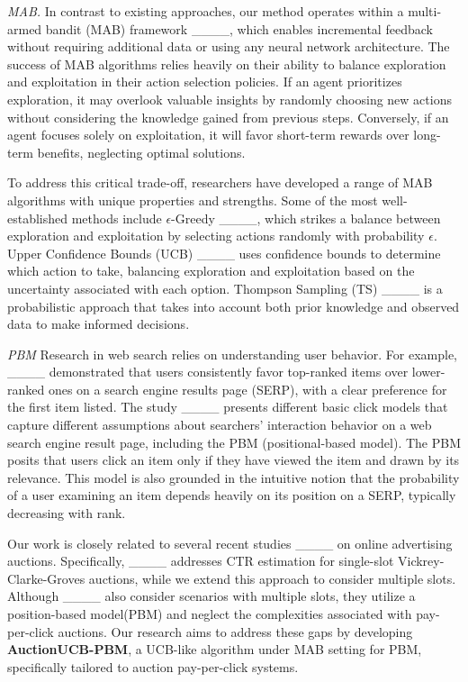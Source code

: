 \textit{MAB.} In contrast to existing approaches, our method operates within a multi-armed bandit (MAB) framework ____, which enables incremental feedback without requiring additional data or using any neural network architecture. The success of MAB algorithms relies heavily on their ability to balance exploration and exploitation in their action selection policies. If an agent prioritizes exploration, it may overlook valuable insights by randomly choosing new actions without considering the knowledge gained from previous steps. Conversely, if an agent focuses solely on exploitation, it will favor short-term rewards over long-term benefits, neglecting optimal solutions.

To address this critical trade-off, researchers have developed a range of MAB algorithms with unique properties and strengths. Some of the most well-established methods include $\epsilon$-Greedy ____, which strikes a balance between exploration and exploitation by selecting actions randomly with probability $\epsilon$. Upper Confidence Bounds (UCB) ____ uses confidence bounds to determine which action to take, balancing exploration and exploitation based on the uncertainty associated with each option. Thompson Sampling (TS) ____ is a probabilistic approach that takes into account both prior knowledge and observed data to make informed decisions.

\textit{PBM} Research in web search relies on understanding user behavior. For example, ____ demonstrated that users consistently favor top-ranked items over lower-ranked ones on a search engine results page (SERP), with a clear preference for the first item listed. The study ____ presents different basic click models that capture different assumptions about searchers' interaction behavior on a web search engine result page, including the PBM (positional-based model). The PBM posits that users click an item only if they have viewed the item and drawn by its relevance. This model is also grounded in the intuitive notion that the probability of a user examining an item depends heavily on its position on a SERP, typically decreasing with rank.

Our work is closely related to several recent studies ____ on online advertising auctions. Specifically,  ____ addresses CTR estimation for single-slot Vickrey-Clarke-Groves auctions, while we extend this approach to consider multiple slots. Although ____ also consider scenarios with multiple slots, they utilize a position-based model(PBM) and neglect the complexities associated with pay-per-click auctions. Our research aims to address these gaps by developing \textbf{AuctionUCB-PBM}, a UCB-like algorithm under MAB setting for PBM, specifically tailored to auction pay-per-click systems.
